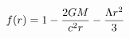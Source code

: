 \documentclass[preview]{standalone}
\begin{document}
\begin{align*}
\special{dvisvgm:raw <g id='unique000'>}f(r) = 1 - \frac{2GM}{c^2 r} - \frac{\Lambda r^2}{3}\special{dvisvgm:raw </g>}
\end{align*}
\end{document}
